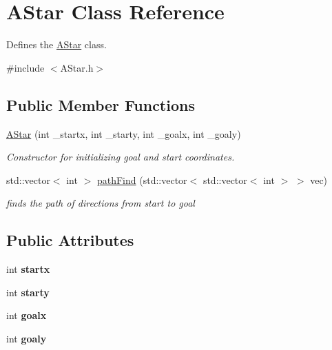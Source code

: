 \hypertarget{classAStar}{}\section{A\+Star Class Reference}
\label{classAStar}


Defines the \hyperlink{classAStar}{A\+Star} class.  




{\ttfamily \#include $<$A\+Star.\+h$>$}

\subsection*{Public Member Functions}
\begin{DoxyCompactItemize}
\item 
\hyperlink{classAStar_a0903f971fd29f74179cf269db934a469}{A\+Star} (int \+\_\+startx, int \+\_\+starty, int \+\_\+goalx, int \+\_\+goaly)
\begin{DoxyCompactList}\small\item\em Constructor for initializing goal and start coordinates. \end{DoxyCompactList}\item 
std\+::vector$<$ int $>$ \hyperlink{classAStar_aa63c6af8c1c0fa4f422775e75ba61c35}{path\+Find} (std\+::vector$<$ std\+::vector$<$ int $>$ $>$ vec)
\begin{DoxyCompactList}\small\item\em finds the path of directions from start to goal \end{DoxyCompactList}\end{DoxyCompactItemize}
\subsection*{Public Attributes}
\begin{DoxyCompactItemize}
\item 
int {\bfseries startx}\hypertarget{classAStar_a7beab7460a53378df536e95d36926082}{}\label{classAStar_a7beab7460a53378df536e95d36926082}

\item 
int {\bfseries starty}\hypertarget{classAStar_a63e9ef8b8a53b36084cc496d9f765415}{}\label{classAStar_a63e9ef8b8a53b36084cc496d9f765415}

\item 
int {\bfseries goalx}\hypertarget{classAStar_aed7140142494cdae9d05ef4f01349c5f}{}\label{classAStar_aed7140142494cdae9d05ef4f01349c5f}

\item 
int {\bfseries goaly}\hypertarget{classAStar_a02edb859e745c730e450e9f18be7f90b}{}\label{classAStar_a02edb859e745c730e450e9f18be7f90b}

\end{DoxyCompactItemize}
